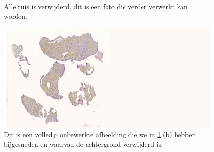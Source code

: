 \documentclass[a4paper,kulak]{kulakarticle}
\begin{document}
\begin{figure}[H]
	\centering
	\qquad
	
	\caption{Alle ruis is verwijderd, dit is een foto die verder verwerkt kan worden.}
	\label{figuur ruisfilter}
\end{figure}

\begin{figure}[H]
	\centering
	\includegraphics[width=15.25cm]{Volledig_onbewerkt}
	
	\caption{Dit is een volledig onbewerkte afbeelding die we in \ref{figuur ruisfilter} (b) hebben bijgesneden en waarvan de achtergrond verwijderd is.}
	\label{figuur volledig_onbewerkt}
\end{figure}
\end{document}
